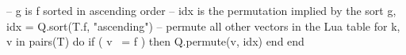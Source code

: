 -- g is f sorted in ascending order
-- idx is the permutation implied by the sort
g, idx = Q.sort(T.f, "ascending")
-- permute all other vectors in the Lua table
for k, v in pairs(T) do 
  if ( v ~= f ) then 
    Q.permute(v, idx)
  end
end

